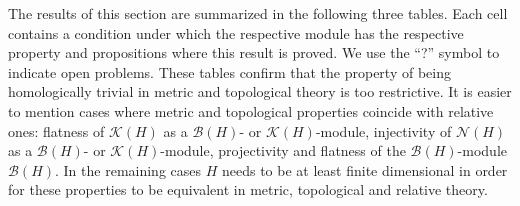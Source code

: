 The results of this section are summarized in the following three tables. Each cell
contains a condition under which the respective module has the respective
property and propositions where this result is proved. We use the ``?'' symbol to indicate
open problems. These tables confirm that the property of being homologically
trivial in metric and topological theory is too restrictive. It is easier to
mention cases where metric and topological properties coincide with relative
ones: flatness of $\mathcal{K}(H)$ as a $\mathcal{B}(H)$- or
$\mathcal{K}(H)$-module, injectivity of $\mathcal{N}(H)$ as a $\mathcal{B}(H)$- or
$\mathcal{K}(H)$-module, projectivity and flatness of the $\mathcal{B}(H)$-module
$\mathcal{B}(H)$. In the remaining cases $H$ needs to be at least finite
dimensional in order for these properties to be equivalent in metric, topological
and relative theory.


